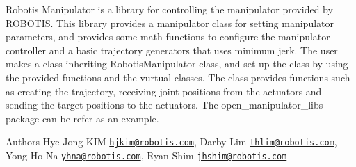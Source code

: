 Robotis Manipulator is a library for controlling the manipulator provided by R\+O\+B\+O\+T\+IS. This library provides a manipulator class for setting manipulator parameters, and provides some math functions to configure the manipulator controller and a basic trajectory generators that uses minimum jerk. The user makes a class inheriting Robotis\+Manipulator class, and set up the class by using the provided functions and the vurtual classes. The class provides functions such as creating the trajectory, receiving joint positions from the actuators and sending the target positions to the actuators. The open\+\_\+manipulator\+\_\+libs package can be refer as an example. \begin{DoxyAuthor}{Authors}
Hye-\/\+Jong K\+IM \href{mailto:hjkim@robotis.com}{\tt hjkim@robotis.\+com}, Darby Lim \href{mailto:thlim@robotis.com}{\tt thlim@robotis.\+com}, Yong-\/\+Ho Na \href{mailto:yhna@robotis.com}{\tt yhna@robotis.\+com}, Ryan Shim \href{mailto:jhshim@robotis.com}{\tt jhshim@robotis.\+com} 
\end{DoxyAuthor}
